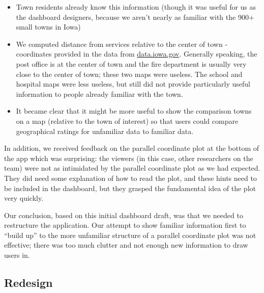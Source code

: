 \documentclass[print]{nuthesis}
\providecommand{\tightlist}{%
  \setlength{\itemsep}{0pt}\setlength{\parskip}{0pt}}
\begin{document}
\begin{itemize}
\tightlist
\item
  Town residents already know this information (though it was useful for us as the dashboard designers, because we aren't nearly as familiar with the 900+ small towns in Iowa)
\item
  We computed distance from services relative to the center of town - coordinates provided in the data from \url{data.iowa.gov}. Generally speaking, the post office is at the center of town and the fire department is usually very close to the center of town; these two maps were useless. The school and hospital maps were less useless, but still did not provide particularly useful information to people already familiar with the town.
\item
  It became clear that it might be more useful to show the comparison towns on a map (relative to the town of interest) so that users could compare geographical ratings for unfamiliar data to familiar data.
\end{itemize}

In addition, we received feedback on the parallel coordinate plot at the bottom of the app which was surprising: the viewers (in this case, other researchers on the team) were not as intimidated by the parallel coordinate plot as we had expected. They did need some explanation of how to read the plot, and these hints need to be included in the dashboard, but they grasped the fundamental idea of the plot very quickly.

Our conclusion, based on this initial dashboard draft, was that we needed to restructure the application. Our attempt to show familiar information first to ``build up'' to the more unfamiliar structure of a parallel coordinate plot was not effective; there was too much clutter and not enough new information to draw users in.

\hypertarget{redesign}{%
\subsection{Redesign}\label{redesign}}
\end{document}
